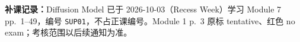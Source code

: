 
\textbf{补课记录：}Diffusion Model 已于 2026-10-03（Recess Week）学习 Module 7 pp.~1--49，编号 \texttt{SUP01}，不占正课编号。Module 1 p.~3 原标 tentative、红色 no exam；考核范围以后续通知为准。
\endgroup
